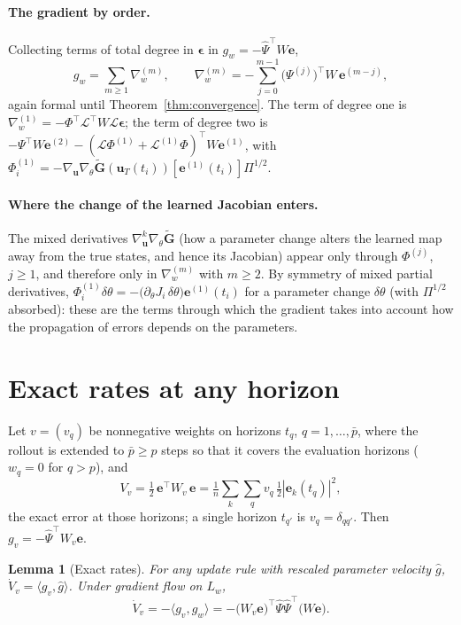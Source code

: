 \documentclass[11pt]{article}
\newtheorem{lemma}{Lemma}
\theoremstyle{definition}
\theoremstyle{remark}
\newcommand{\uu}{\mathbf{u}}
\newcommand{\ee}{\mathbf{e}}
\newcommand{\Gt}{\tilde{\mathbf{G}}}
\newcommand{\eps}{\bm{\epsilon}}
\newcommand{\LL}{\mathcal{L}}
\newcommand{\Psih}{\hat\Psi}
\begin{document}
\paragraph{The gradient by order.}
Collecting terms of total degree in $\eps$ in $g_w=-\Psih^\top W\ee$,
\begin{equation}\label{eq:gradorders}
g_w=\sum_{m\ge1}\nabla^{(m)}_w,\qquad \nabla^{(m)}_w=-\sum_{j=0}^{m-1}\big(\Psi^{(j)}\big)^\top W\,\ee^{(m-j)},
\end{equation}
again formal until Theorem~\ref{thm:convergence}.
The term of degree one is $\nabla^{(1)}_w=-\Phi^\top\LL^\top W\LL\eps$; the term of degree two is $-\Psi^\top W\ee^{(2)}-(\LL\Phi^{(1)}+\LL^{(1)}\Phi)^\top W\ee^{(1)}$, with $\Phi^{(1)}_i=-\nabla_\uu\nabla_\theta\Gt(\uu_T(t_i))[\ee^{(1)}(t_i)]\Pi^{1/2}$.

\paragraph{Where the change of the learned Jacobian enters.}
The mixed derivatives $\nabla_\uu^k\nabla_\theta\Gt$ (how a parameter change alters the learned map away from the true states, and hence its Jacobian) appear only through $\Phi^{(j)}$, $j\ge1$, and therefore only in $\nabla^{(m)}_w$ with $m\ge2$.
By symmetry of mixed partial derivatives, $\Phi^{(1)}_i\delta\theta=-\big(\partial_\theta J_i\,\delta\theta\big)\ee^{(1)}(t_i)$ for a parameter change $\delta\theta$ (with $\Pi^{1/2}$ absorbed): these are the terms through which the gradient takes into account how the propagation of errors depends on the parameters.

\section{Exact rates at any horizon}\label{sec:rates}

Let $v=(v_q)$ be nonnegative weights on horizons $t_q$, $q=1,\dots,\bar p$, where the rollout is extended to $\bar p\ge p$ steps so that it covers the evaluation horizons ($w_q=0$ for $q>p$), and
\[
V_v=\tfrac12\,\ee^\top W_v\,\ee=\tfrac1n\sum_k\sum_q v_q\,\tfrac12|\ee_k(t_q)|^2 ,
\]
the exact error at those horizons; a single horizon $t_{q'}$ is $v_q=\delta_{qq'}$.
Then $g_v=-\Psih^\top W_v\ee$.

\begin{lemma}[Exact rates]\label{lem:rates}
For any update rule with rescaled parameter velocity $\hat g$, $\dot V_v=\langle g_v,\hat g\rangle$.
Under gradient flow on $L_w$,
\begin{equation}\label{eq:tradeoff}
\dot V_v=-\langle g_v,g_w\rangle=-\big(W_v\ee\big)^\top\Psih\Psih^\top\big(W\ee\big).
\end{equation}
\end{lemma}
\end{document}
